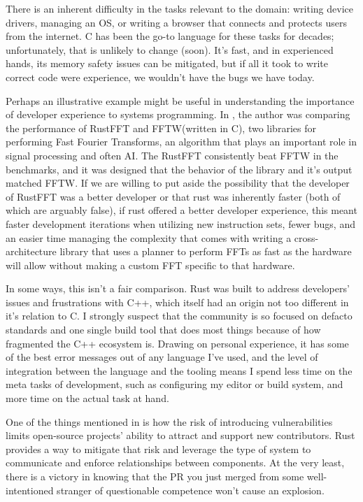 \documentclass[conference]{IEEEtran}
\begin{document}
There is an inherent difficulty in the tasks relevant to the domain: writing device drivers, managing an OS, or writing a browser that connects and protects users from the internet. C has been the go-to language for these tasks for decades; unfortunately, that is unlikely to change (soon). It's fast, and in experienced hands, its memory safety issues can be mitigated, but if all it took to write correct code were experience, we wouldn't have the bugs we have today.

Perhaps an illustrative example might be useful in understanding the importance of developer experience to systems programming. In  \cite{rooneyEvaluatingFFTPerformance2023}, the author was comparing the performance of RustFFT and FFTW(written in C), two libraries for performing Fast Fourier Transforms, an algorithm that plays an important role in signal processing and often AI. The RustFFT consistently beat FFTW in the benchmarks, and it was designed that the behavior of the library and it's output matched FFTW. If we are willing to put aside the possibility that the developer of RustFFT was a better developer or that rust was inherently faster (both of which are arguably false), if rust offered a better developer experience, this meant faster development iterations when utilizing new instruction sets, fewer bugs, and an easier time managing the complexity that comes with writing a cross-architecture library that uses a planner to perform FFTs as fast as the hardware will allow without making a custom FFT specific to that hardware.

In some ways, this isn't a fair comparison. Rust was built to address developers' issues and frustrations with C++, which itself had an origin not too different in it's relation to C. I strongly suspect that the community is so focused on defacto standards and one single build tool that does most things because of how fragmented the C++ ecosystem is. Drawing on personal experience, it has some of the best error messages out of any language I've used, and the level of integration between the language and the tooling means I spend less time on the meta tasks of development, such as configuring my editor or build system, and more time on the actual task at hand.

One of the things mentioned in \cite{traceyGradingCurveHow2023} is how the risk of introducing vulnerabilities limits open-source projects' ability to attract and support new contributors. Rust provides a way to mitigate that risk and leverage the type of system to communicate and enforce relationships between components. At the very least, there is a victory in knowing that the PR you just merged from some well-intentioned stranger of questionable competence won't cause an explosion.
\end{document}

